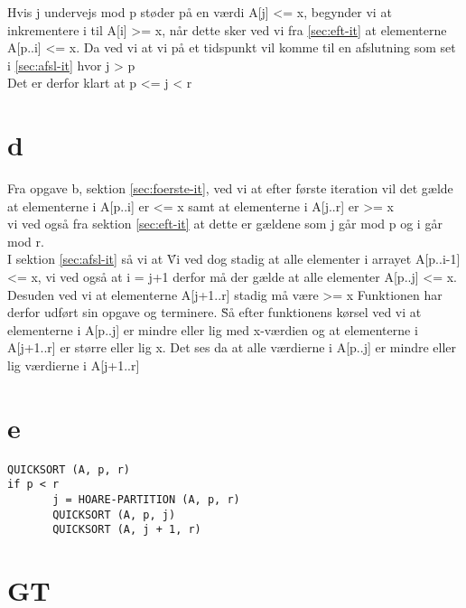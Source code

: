 \documentclass[10pt,a4paper,danish]{article}
\begin{document}
Hvis j undervejs mod p støder på en værdi A[j] <= x, begynder vi at inkrementere i til A[i] >= x, når dette sker ved vi fra \ref{sec:eft-it} at elementerne A[p..i] <= x. Da ved vi at vi på et tidspunkt vil komme til en afslutning som set i \ref{sec:afsl-it} hvor j > p
\\

Det er derfor klart at p <= j < r



\section{d}

Fra opgave b, sektion \ref{sec:foerste-it}, ved vi at efter første iteration vil det gælde at elementerne i A[p..i] er <= x samt at elementerne i A[j..r] er >= x
\\

vi ved også fra sektion \ref{sec:eft-it} at dette er gældene som j går mod p og i går mod r.
\\

I sektion \ref{sec:afsl-it} så vi at \" Vi ved dog stadig at alle elementer i arrayet A[p..i-1] <= x, vi ved også at i = j+1 derfor må der gælde at alle elementer A[p..j] <= x. Desuden ved vi at elementerne A[j+1..r] stadig må være >= x
Funktionen har derfor udført sin opgave og terminere. \"
Så efter funktionens kørsel ved vi at elementerne i A[p..j] er mindre eller lig med x-værdien og at elementerne i A[j+1..r] er større eller lig x. Det ses da at alle værdierne i A[p..j] er mindre eller lig værdierne i A[j+1..r]

\section{e}
\begin{verbatim}
QUICKSORT (A, p, r)
if p < r
       j = HOARE-PARTITION (A, p, r)
       QUICKSORT (A, p, j)
       QUICKSORT (A, j + 1, r)
\end{verbatim}

\section{GT}
\end{document}
